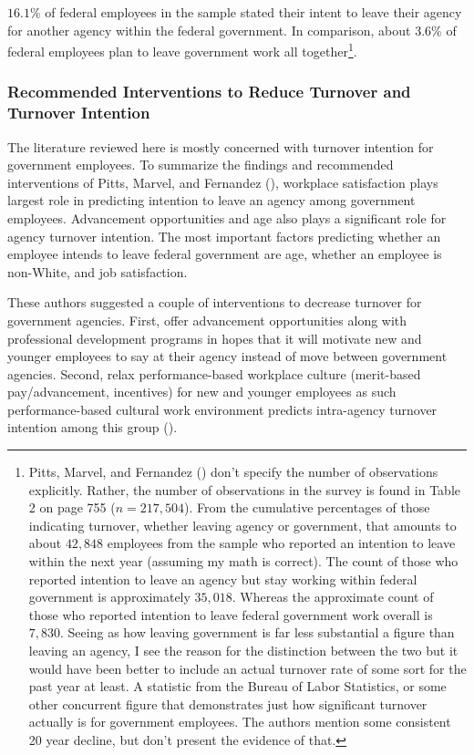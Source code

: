\documentclass[
  11pt,
  a4paper,
]{article}
\begin{document}
\(16.1\%\) of federal employees in the sample stated their intent to
leave their agency for another agency within the federal government. In
comparison, about \(3.6\%\) of federal employees plan to leave
government work all together\footnote{Pitts, Marvel, and Fernandez
  () don't specify the number of
  observations explicitly. Rather, the number of observations in the
  survey is found in Table 2 on page 755 (\(n = 217,504\)). From the
  cumulative percentages of those indicating turnover, whether leaving
  agency or government, that amounts to about \(42,848\) employees from
  the sample who reported an intention to leave within the next year
  (assuming my math is correct). The count of those who reported
  intention to leave an agency but stay working within federal
  government is approximately \(35,018\). Whereas the approximate count
  of those who reported intention to leave federal government work
  overall is \(7,830\). Seeing as how leaving government is far less
  substantial a figure than leaving an agency, I see the reason for the
  distinction between the two but it would have been better to include
  an actual turnover rate of some sort for the past year at least. A
  statistic from the Bureau of Labor Statistics, or some other
  concurrent figure that demonstrates just how significant turnover
  actually is for government employees. The authors mention some
  consistent 20 year decline, but don't present the evidence of that.}.

\subsubsection{Recommended Interventions to Reduce Turnover and Turnover
Intention}\label{recommended-interventions-to-reduce-turnover-and-turnover-intention}

The literature reviewed here is mostly concerned with turnover intention
for government employees. To summarize the findings and recommended
interventions of Pitts, Marvel, and Fernandez
(), workplace satisfaction plays largest
role in predicting intention to leave an agency among government
employees. Advancement opportunities and age also plays a significant
role for agency turnover intention. The most important factors
predicting whether an employee intends to leave federal government are
age, whether an employee is non-White, and job satisfaction.

These authors suggested a couple of interventions to decrease turnover
for government agencies. First, offer advancement opportunities along
with professional development programs in hopes that it will motivate
new and younger employees to say at their agency instead of move between
government agencies. Second, relax performance-based workplace culture
(merit-based pay/advancement, incentives) for new and younger employees
as such performance-based cultural work environment predicts
intra-agency turnover intention among this group
().
\end{document}
